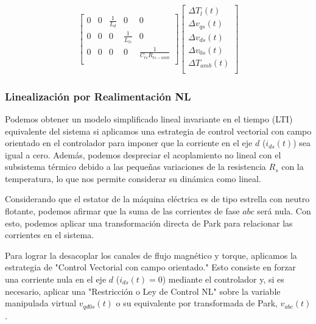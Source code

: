 \documentclass{article}
\begin{document}
\begin{itemize}
\begin{equation*}
\begin{gathered}
\begin{bmatrix}
        0 & 0 & \frac{1}{L_{d}} & 0 & 0\\
        0 & 0 & 0 & \frac{1}{L_{ls}} & 0\\
        0 & 0 & 0 & 0 & \frac{1}{C_{ts}R_{ts-amb}}\\
    \end{bmatrix}
    \begin{bmatrix}
        \Delta{T}_{l}(t)\\
        \Delta{v}_{qs}(t)\\
        \Delta{v}_{ds}(t)\\
        \Delta{v}_{0s}(t)\\
        \Delta T_{amb}(t)\\
    \end{bmatrix} 
\end{gathered}
\end{equation*}

\end{itemize}


\subsubsection{Linealización por Realimentación NL}

Podemos obtener un modelo simplificado lineal invariante en el tiempo (LTI) equivalente del sistema
si aplicamos una estrategia de control vectorial con campo orientado en el controlador para imponer
que la corriente en el eje $d$ ($i_{ds}(t)$) sea igual a cero. Además, podemos despreciar 
el acoplamiento no lineal con el subsistema térmico debido a las pequeñas variaciones de la 
resistencia \(R_s\) con la temperatura, lo que nos permite considerar su dinámica como lineal.

Considerando que el estator de la máquina eléctrica es de tipo estrella con neutro flotante, 
podemos afirmar que la suma de las corrientes de fase \(abc\) será nula. Con esto, podemos aplicar 
una transformación directa de Park para relacionar las corrientes en el sistema.

Para lograr la desacoplar los canales de flujo magnético y torque, aplicamos la estrategia de 
"Control Vectorial con campo orientado." Esto consiste en forzar una corriente nula en el eje 
$d$ ($i_{ds}(t) = 0$) mediante el controlador y, si es necesario, aplicar una "Restricción o Ley 
de Control NL" sobre la variable manipulada virtual \(v_{qd0s}(t)\) o su equivalente por 
transformada de Park, \(v_{{abc}}(t)\).
\end{document}
